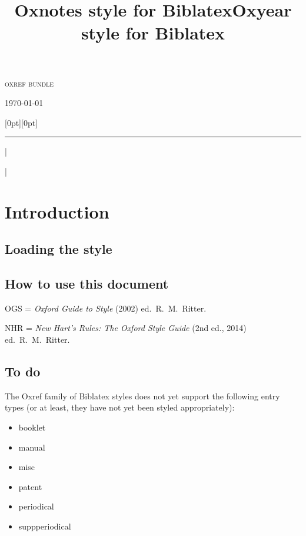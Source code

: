 \documentclass[extrafontsizes,11pt,a4paper,oneside]{memoir}
\title{Oxnotes style for Biblatex}|
\title{Oxyear style for Biblatex}|
\begin{document}
\thispagestyle{empty}
\begin{adjustwidth}{.2\textwidth}{0pt}
  \sffamily\setlength{\parindent}{0pt}%
  \LARGE\textsc{oxref bundle}
  
  \LARGE\thetitle
  
  \bigskip
  \Large\theauthor
  
  \bigskip
  \Large\ifx\undefined\thedate\today\else\thedate\fi
\end{adjustwidth}

\noindent
\hspace*{.1\textwidth}\raisebox{0pt}[0pt][0pt]{\rule{\normalrulethickness}{\textheight}}

\newpage
\tableofcontents*
|


\todoc|
\chapter{Introduction}

\section{Loading the style}

\section{How to use this document}

OGS = \emph{Oxford Guide to Style} (2002) ed.~R.~M.\ Ritter.

NHR = \emph{New Hart's Rules: The Oxford Style Guide} (2nd ed., 2014) ed.~R.~M.\ Ritter.

\section{To do}

The Oxref family of Biblatex styles does not yet support the following entry types
(or at least, they have not yet been styled appropriately):

\begin{multicols}{2}
  \begin{itemize}\firmlist
    \item booklet
    \item manual
    \item misc
    \item patent
    \item periodical
    \item suppperiodical
  \end{itemize}
\end{multicols}
\end{document}
